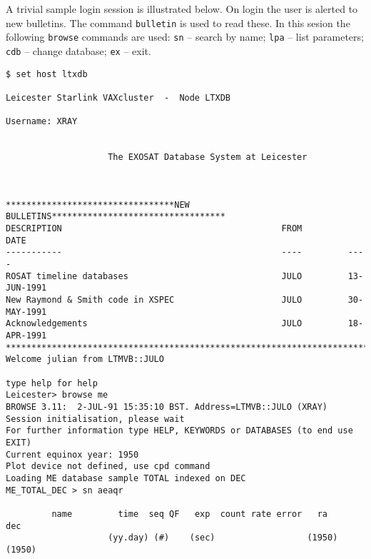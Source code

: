A trivial sample login session is illustrated below. On login the user is
alerted to new bulletins. The command {\tt bulletin} is used to read these.
In this sesion the following
{\tt browse} commands are used: {\tt sn} -- search by name;
{\tt lpa} -- list parameters; {\tt cdb} -- change database; {\tt ex} -- exit.

\begin{verbatim}
$ set host ltxdb

Leicester Starlink VAXcluster  -  Node LTXDB

Username: XRAY


                    The EXOSAT Database System at Leicester



*********************************NEW BULLETINS**********************************
DESCRIPTION                                           FROM         DATE
-----------                                           ----         ----
ROSAT timeline databases                              JULO         13-JUN-1991
New Raymond & Smith code in XSPEC                     JULO         30-MAY-1991
Acknowledgements                                      JULO         18-APR-1991
********************************************************************************
Welcome julian from LTMVB::JULO

type help for help
Leicester> browse me
BROWSE 3.11:  2-JUL-91 15:35:10 BST. Address=LTMVB::JULO (XRAY)
Session initialisation, please wait
For further information type HELP, KEYWORDS or DATABASES (to end use EXIT)
Current equinox year: 1950
Plot device not defined, use cpd command
Loading ME database sample TOTAL indexed on DEC
ME_TOTAL_DEC > sn aeaqr

         name         time  seq QF   exp  count rate error   ra        dec
                    (yy.day) (#)    (sec)                  (1950)     (1950)


\end{verbatim}
